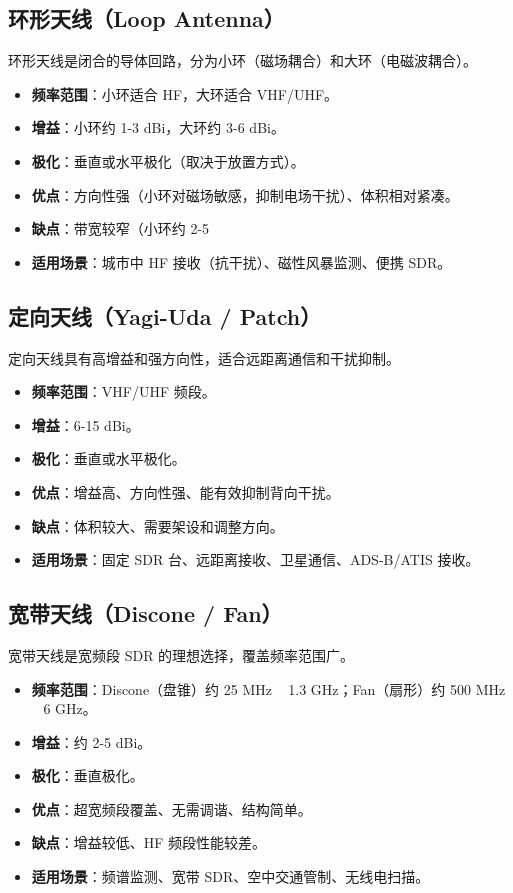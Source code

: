 \documentclass[12pt,UTF8]{ctexbook}
\begin{document}
\subsection{环形天线（Loop Antenna）}
环形天线是闭合的导体回路，分为小环（磁场耦合）和大环（电磁波耦合）。

\begin{itemize}[leftmargin=2cm]
    \item \textbf{频率范围}：小环适合 HF，大环适合 VHF/UHF。
    \item \textbf{增益}：小环约 1-3 dBi，大环约 3-6 dBi。
    \item \textbf{极化}：垂直或水平极化（取决于放置方式）。
    \item \textbf{优点}：方向性强（小环对磁场敏感，抑制电场干扰）、体积相对紧凑。
    \item \textbf{缺点}：带宽较窄（小环约 2-5%
    \item \textbf{适用场景}：城市中 HF 接收（抗干扰）、磁性风暴监测、便携 SDR。
\end{itemize}

\subsection{定向天线（Yagi-Uda / Patch）}
定向天线具有高增益和强方向性，适合远距离通信和干扰抑制。

\begin{itemize}[leftmargin=2cm]
    \item \textbf{频率范围}：VHF/UHF 频段。
    \item \textbf{增益}：6-15 dBi。
    \item \textbf{极化}：垂直或水平极化。
    \item \textbf{优点}：增益高、方向性强、能有效抑制背向干扰。
    \item \textbf{缺点}：体积较大、需要架设和调整方向。
    \item \textbf{适用场景}：固定 SDR 台、远距离接收、卫星通信、ADS-B/ATIS 接收。
\end{itemize}

\subsection{宽带天线（Discone / Fan）}
宽带天线是宽频段 SDR 的理想选择，覆盖频率范围广。

\begin{itemize}[leftmargin=2cm]
    \item \textbf{频率范围}：Discone（盘锥）约 25 MHz ~ 1.3 GHz；Fan（扇形）约 500 MHz ~ 6 GHz。
    \item \textbf{增益}：约 2-5 dBi。
    \item \textbf{极化}：垂直极化。
    \item \textbf{优点}：超宽频段覆盖、无需调谐、结构简单。
    \item \textbf{缺点}：增益较低、HF 频段性能较差。
    \item \textbf{适用场景}：频谱监测、宽带 SDR、空中交通管制、无线电扫描。
\end{itemize}
\end{document}

